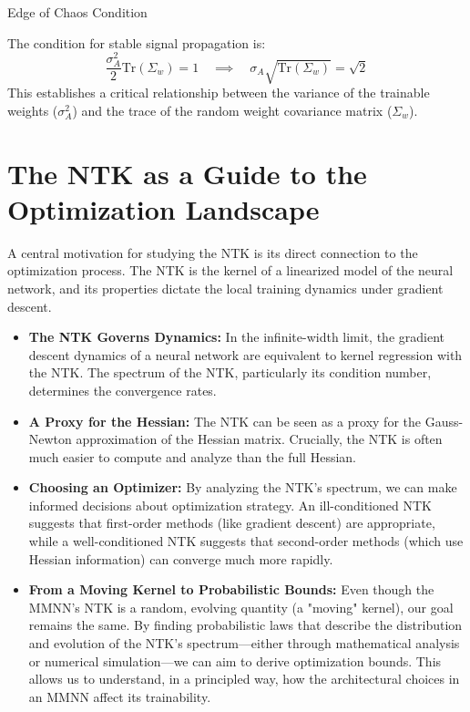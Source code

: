 \documentclass[a4paper]{article}
\begin{document}
{Edge of Chaos Condition}

The condition for stable signal propagation is:
\begin{equation}
    \frac{\sigma_A^2}{2} \text{Tr}(\Sigma_w) = 1 \quad \implies \quad \sigma_A \sqrt{\text{Tr}(\Sigma_w)} = \sqrt{2}
\end{equation}
This establishes a critical relationship between the variance of the trainable weights ($\sigma_A^2$) and the trace of the random weight covariance matrix ($\Sigma_w$).

\section{The NTK as a Guide to the Optimization Landscape}
A central motivation for studying the NTK is its direct connection to the optimization process. The NTK is the kernel of a linearized model of the neural network, and its properties dictate the local training dynamics under gradient descent.

\begin{itemize}
    \item \textbf{The NTK Governs Dynamics:} In the infinite-width limit, the gradient descent dynamics of a neural network are equivalent to kernel regression with the NTK. The spectrum of the NTK, particularly its condition number, determines the convergence rates.
    \item \textbf{A Proxy for the Hessian:} The NTK can be seen as a proxy for the Gauss-Newton approximation of the Hessian matrix. Crucially, the NTK is often much easier to compute and analyze than the full Hessian.
    \item \textbf{Choosing an Optimizer:} By analyzing the NTK's spectrum, we can make informed decisions about optimization strategy. An ill-conditioned NTK suggests that first-order methods (like gradient descent) are appropriate, while a well-conditioned NTK suggests that second-order methods (which use Hessian information) can converge much more rapidly.
    \item \textbf{From a Moving Kernel to Probabilistic Bounds:} Even though the MMNN's NTK is a random, evolving quantity (a "moving" kernel), our goal remains the same. By finding probabilistic laws that describe the distribution and evolution of the NTK's spectrum—either through mathematical analysis or numerical simulation—we can aim to derive optimization bounds. This allows us to understand, in a principled way, how the architectural choices in an MMNN affect its trainability.
\end{itemize}
\end{document}
